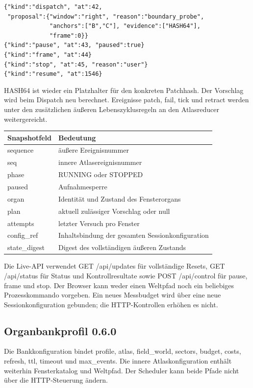 \documentclass[11pt,a4paper]{article}
\begin{document}
\begin{lstlisting}
{"kind":"dispatch", "at":42,
 "proposal":{"window":"right", "reason":"boundary_probe",
             "anchors":["B","C"], "evidence":["HASH64"],
             "frame":0}}
{"kind":"pause", "at":43, "paused":true}
{"kind":"frame", "at":44}
{"kind":"stop", "at":45, "reason":"user"}
{"kind":"resume", "at":1546}
\end{lstlisting}
HASH64 ist wieder ein Platzhalter für den konkreten Patchhash.
Der Vorschlag wird beim Dispatch neu berechnet. Ereignisse patch,
fail, tick und retract werden unter den zusätzlichen äußeren
Lebenszyklusregeln an den Atlasreducer weitergereicht.

\begin{tabularx}{\linewidth}{@{}lY@{}}\toprule
Snapshotfeld & Bedeutung\\\midrule
sequence & äußere Ereignisnummer\\
seq & innere Atlasereignisnummer\\
phase & RUNNING oder STOPPED\\
paused & Aufnahmesperre\\
organ & Identität und Zustand des Fensterorgans\\
plan & aktuell zulässiger Vorschlag oder null\\
attempts & letzter Versuch pro Fenster\\
config\_ref & Inhaltsbindung der gesamten Sessionkonfiguration\\
state\_digest & Digest des vollständigen äußeren Zustands\\\bottomrule
\end{tabularx}

Die Live-API verwendet GET /api/updates für vollständige Resets,
GET /api/status für Status und Kontrollresultate sowie
POST /api/control für pause, frame und stop. Der Browser kann weder
einen Weltpfad noch ein beliebiges Prozesskommando vorgeben.
Ein neues Messbudget wird über eine neue Sessionkonfiguration
gebunden; die HTTP-Kontrollen erhöhen es nicht.

\clearpage
\subsection{Organbankprofil 0.6.0}
Die Bankkonfiguration bindet profile, atlas, field\_world, sectors,
budget, costs, refresh, ttl, timeout und max\_events. Die innere
Atlaskonfiguration enthält weiterhin Fensterkatalog und Weltpfad.
Der Scheduler kann beide Pfade nicht über die HTTP-Steuerung ändern.
\end{document}
